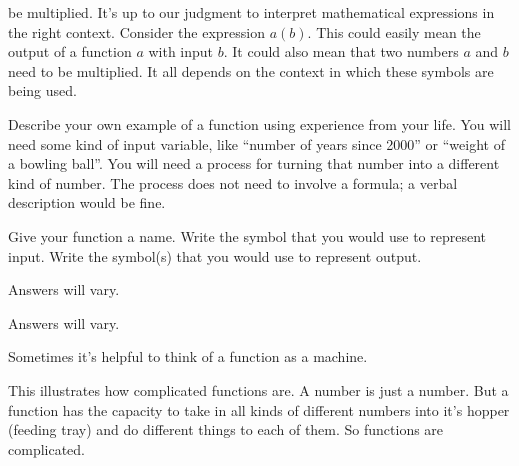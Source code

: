        		be multiplied. It's up to our judgment to interpret mathematical expressions in the
       		right context. Consider the expression $a(b)$. This could easily mean the output of
       		a function $a$ with input $b$. It could also mean that two numbers $a$ and $b$ need
       		to be multiplied. It all depends on the context in which these symbols are being used.
%
\begin{checkpoint}
\begin{problem}
Describe your own example of a function using experience from your life. You will need some 
                    kind of input variable, like ``number of years since 2000'' or ``weight of a bowling ball''. You will 
				need a process for turning that number into a different kind of number. The process does not need to
                		involve a formula; a verbal description would be fine.
%
\par Give your function a name. Write the symbol that you would use to represent
                		input. Write the symbol(s) that you would use to represent output.
%
\begin{longsolution}
%
Answers will vary.
%
\end{longsolution}
%
\begin{shortsolution}
%
Answers will vary.
%
\end{shortsolution}
%
\end{problem}
%
\end{checkpoint}
%
\par Sometimes it's helpful to think of a function as a machine.
%
\par This illustrates how complicated functions are. A number is just a number. But a function has the capacity to 
		take in all kinds of different numbers into it's hopper (feeding tray) and do different things to each of them. So
		functions are complicated.
%
\typeout{************************************************}
\typeout{************************************************}
%
